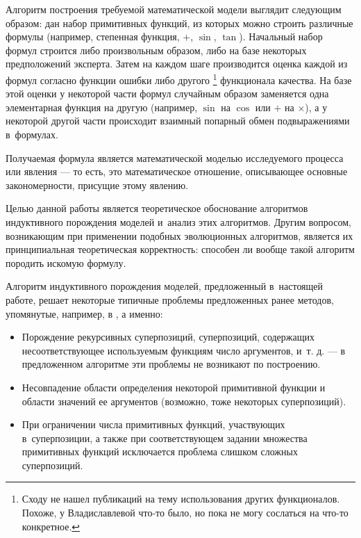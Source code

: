 \documentclass[12pt,a4paper]{amsart}
\begin{document}
Алгоритм построения требуемой математической модели выглядит следующим образом:
дан набор примитивных функций, из которых можно строить различные формулы
(например, степенная функция, $+$, $\sin$, $\tan$). Начальный набор формул
строится либо произвольным образом, либо на базе некоторых предположений
эксперта. Затем на каждом шаге производится оценка каждой из формул согласно
функции ошибки либо другого \footnote{Сходу не нашел публикаций на тему
использования других функционалов. Похоже, у Владиславлевой что-то было, но
пока не могу сослаться на что-то конкретное.} функционала качества. На базе
этой оценки у некоторой части формул случайным образом заменяется одна элементарная
функция на другую (например, $\sin$ на $\cos$ или $+$ на $\times$), а у некоторой
другой части происходит взаимный попарный обмен подвыражениями в~формулах.

Получаемая формула является математической моделью \cite{Pavlovsky2000}
исследуемого процесса или явления --- то есть, это математическое отношение,
описывающее основные закономерности, присущие этому явлению.


Целью данной работы является теоретическое обоснование алгоритмов индуктивного
порождения моделей и~анализ этих алгоритмов. Другим вопросом, возникающим при
применении подобных эволюционных алгоритмов, является их принципиальная
теоретическая корректность: способен ли вообще такой алгоритм породить искомую
формулу.

Алгоритм индуктивного порождения моделей, предложенный в~настоящей работе, решает
некоторые типичные проблемы предложенных ранее методов, упомянутые, например,
в \cite{Zelinka2008}, а именно:
\begin{itemize}
  \item Порождение рекурсивных суперпозиций, суперпозиций, содержащих
	несоответствующее используемым функциям число аргументов, и~т. д. --- в
	предложенном алгоритме эти проблемы не возникают по построению.
  \item Несовпадение области определения некоторой примитивной функции и области
	значений ее аргументов (возможно, тоже некоторых суперпозиций).
  \item При ограничении числа примитивных функций, участвующих в~суперпозиции,
	а также при соответствующем задании множества примитивных функций
	исключается проблема слишком сложных суперпозиций.
\end{itemize}
\end{document}
